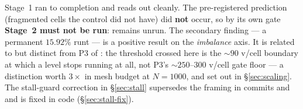 \documentclass[11pt,a4paper]{article}
\begin{document}
\begin{tcolorbox}[colback=orange!5!white, colframe=orange!70!black,
                  title={Status --- measured; hypothesis REFUTED, with a
                         methodological correction},
                  fontupper=\small]
Stage~1 ran to completion and reads out cleanly. The pre-registered prediction
(fragmented cells the control did not have) did \textbf{not} occur, so by its own
gate \textbf{Stage~2 must not be run}:
 remains unrun.
The secondary finding --- a permanent \(15.92\%\) runt --- is a positive result on
the \emph{imbalance} axis. It is related to but distinct from P3 of
: the threshold crossed
here is the \(\sim\!90\) v/cell boundary at which a level stops running at all,
not P3's \(\sim\!250\text{--}300\) v/cell gate floor --- a distinction worth
\(3\times\) in mesh budget at \(N{=}1000\), and set out in
\S\ref{sec:scaling}. The stall-guard correction in
\S\ref{sec:stall} supersedes the framing in commits  and
 and is fixed in code (\S\ref{sec:stall-fix}).
\end{tcolorbox}
\end{document}
